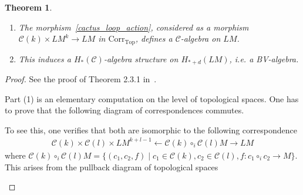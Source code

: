 \documentclass{scrartcl}
\theoremstyle{plain}
\newtheorem{theorem}{Theorem}[section]
\theoremstyle{definition}
\newcommand{\comp}{\circ}
\begin{document}
\begin{theorem}
    \begin{enumerate}[(1)]
        \item The morphism~\eqref{cactus_loop_action}, considered as a morphism $\mathcal C(k) \times LM^k \to LM$ in $\mathrm{Corr}_{\mathrm{Top}}$, defines a $\mathcal C$-algebra on $LM$.
        \item This induces a $H_*(\mathcal C)$-algebra structure on $H_{*+d}(LM)$, i.e. a BV-algebra.
    \end{enumerate}
\end{theorem}

\begin{proof}
    See the proof of Theorem 2.3.1 in~\cite{cohen2006string}. 

    Part (1) is an elementary computation on the level of topological spaces. One has to prove that the following diagram of correspondences commutes. 

    \begin{center}
    \end{center}
    
    To see this, one verifies that both are isomorphic to the following correspondence
    \begin{align*}
        \mathcal C(k) \times \mathcal C(l)\times LM^{k+l-1} \leftarrow \mathcal C(k)\comp_i \mathcal C(l)M \to LM
    \end{align*}
    where $\mathcal C(k)\comp_i \mathcal C(l)M = \{(c_1, c_2, f) \mid c_1\in \mathcal C(k), c_2\in\mathcal C(l), f\colon c_1\comp_i c_2 \to M\}$. This arises from the pullback diagram of topological spaces
    \begin{center}
    \end{center}



\end{proof}
\end{document}
